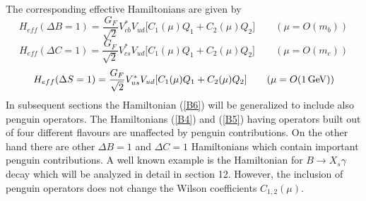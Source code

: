 \documentclass[12pt]{article}
\newcommand{\gev}{\, {\rm GeV}}
\begin{document}
\begin{itemize}
\begin{itemize}
The corresponding  effective Hamiltonians are given by
\begin{equation}\label{B4}
H_{eff}(\Delta B=1)=\frac{G_F}{\sqrt{2}}V_{cb}^{*}V_{ud}
\lbrack C_1(\mu) Q_1+C_2(\mu)Q_2 \rbrack
\qquad
(\mu=O(m_b))
\end{equation}
\begin{equation}\label{B5}
H_{eff}(\Delta C=1)=\frac{G_F}{\sqrt{2}}V_{cs}^{*}V_{ud}
\lbrack C_1(\mu) Q_1+C_2(\mu)Q_2 \rbrack
\qquad
(\mu=O(m_c))
\end{equation}
\begin{equation}\label{B6}
H_{eff}(\Delta S=1)=\frac{G_F}{\sqrt{2}}V_{us}^{*}V_{ud}
\lbrack C_1(\mu) Q_1+C_2(\mu)Q_2 \rbrack
\qquad
(\mu=O(1\gev))
\end{equation}
In subsequent sections the Hamiltonian (\ref{B6}) will be
generalized to include also penguin operators. 
The Hamiltonians (\ref{B4}) and (\ref{B5}) having operators
built out of four different flavours are unaffected by
penguin contributions. On the other hand there are other
$\Delta B=1$ and $\Delta C=1$ Hamiltonians which contain
important penguin contributions. A well known example is
the Hamiltonian for $B\to X_s\gamma$ decay which will be
analyzed in detail in section 12.
However, the inclusion of penguin operators does not
change the Wilson coefficients $C_{1,2}(\mu)$.


\end{itemize}
\end{itemize}
\end{document}
